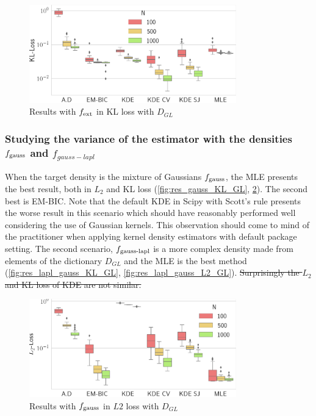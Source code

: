 \begin{figure}
\center
    \includegraphics[width=0.8\textwidth]{./TeX_files/res_lapl_gauss_not_dict_KL_GL.png}
    \caption{Results with $f_{\textnormal{ext}}$ in KL loss with $D_{GL}$}
    \label{fig:res_ext_KL_GL}
\end{figure}
\subsubsection{Studying the variance of the estimator with the densities $f_{\textnormal{gauss}}$ and $f_{gauss-lapl}$}
When the target density is the mixture of Gaussians $f_{\textnormal{gauss}}$, the MLE presents the best result, both in $L_2$ and KL loss (\cref{fig:res_gauss_KL_GL}, \cref{fig:res_gauss_L2_GL}). The second best is EM-BIC. Note that the default KDE in Scipy\citep{scipy} with Scott's rule presents the worse result in this scenario which should have reasonably performed well considering the use of Gaussian kernels. This observation should come to mind of the practitioner when applying kernel density estimators with default package setting. The second scenario, $f_{\textnormal{gauss-lapl}}$ is a more complex density made from elements of the dictionary $D_{GL}$ and the MLE is the best method (\cref{fig:res_lapl_gauss_KL_GL}, \cref{fig:res_lapl_gauss_L2_GL}). \sout{Surprisingly the $L_2$ and KL loss of KDE are not similar.}
\begin{figure}
\center
    \includegraphics[width=0.8\textwidth]{./TeX_files/res_gauss_L2_GL.png}
    \caption{Results with $f_{\textnormal{gauss}}$ in $L2$ loss with $D_{GL}$}
    \label{fig:res_gauss_L2_GL}
\end{figure}

